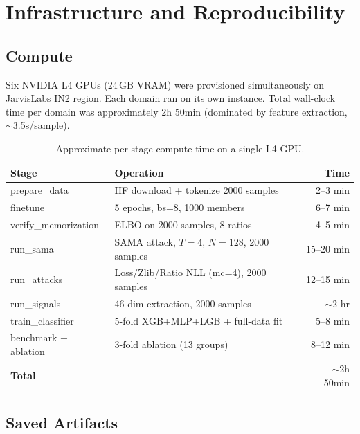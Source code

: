 \documentclass[11pt,a4paper]{article}
\begin{document}
\section{Infrastructure and Reproducibility}

\subsection{Compute}

Six NVIDIA L4 GPUs (24\,GB VRAM) were provisioned simultaneously on JarvisLabs
IN2 region. Each domain ran on its own instance. Total wall-clock time per
domain was approximately 2h 50min (dominated by feature extraction, $\sim$3.5s/sample).

\begin{table}[H]
\centering
\caption{Approximate per-stage compute time on a single L4 GPU.}
\begin{tabular}{llr}
\toprule
\textbf{Stage} & \textbf{Operation} & \textbf{Time} \\
\midrule
prepare\_data       & HF download + tokenize 2000 samples & 2--3 min \\
finetune            & 5 epochs, bs=8, 1000 members         & 6--7 min \\
verify\_memorization & ELBO on 2000 samples, 8 ratios       & 4--5 min \\
run\_sama           & SAMA attack, $T=4$, $N=128$, 2000 samples & 15--20 min \\
run\_attacks        & Loss/Zlib/Ratio NLL (mc=4), 2000 samples  & 12--15 min \\
run\_signals        & 46-dim extraction, 2000 samples      & $\sim$2 hr \\
train\_classifier   & 5-fold XGB+MLP+LGB + full-data fit   & 5--8 min \\
benchmark + ablation & 3-fold ablation (13 groups)          & 8--12 min \\
\midrule
\textbf{Total}      & &  $\sim$2h 50min \\
\bottomrule
\end{tabular}
\end{table}

\subsection{Saved Artifacts}
\end{document}
